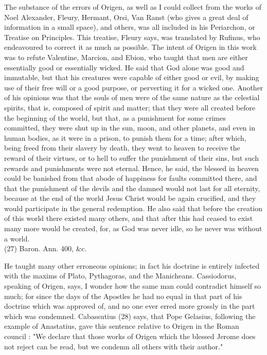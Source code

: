 \documentclass[12pt]{book}
\begin{document}
The substance of the errors of Origen, as well as I could collect from the works of Noel Alexander, Fleury,
Hermant, Orsi, Van Ranst (who gives a great deal of information in a small space), and others, was all
included in his Periarchon, or Treatise on Principles. This treatise, Fleury says, was translated by Rufinus,
who endeavoured to correct it as much as possible. The intent of Origen in this work was to refute
Valentine, Marcion, and Ebion, who taught that men are either essentially good or essentially wicked. He
said that God alone was good and immutable, but that his creatures were capable of either good or evil,
by making use of their free will or a good purpose, or perverting it for a wicked one. Another of his
opinions was that the souls of men were of the same nature as the celestial spirits, that is, composed of
spirit and matter; that they were all created before the beginning of the world, but that, as a punishment
for some crimes committed, they were shut up in the sun, moon, and other planets, and even in human
bodies, as it were in a prison, to punish them for a time; after which, being freed from their slavery by
death, they went to heaven to receive the reward of their virtues, or to hell to suffer the punishment of
their sins, but such rewards and punishments were not eternal. Hence, he said, the blessed in heaven
could be banished from that abode of happiness for faults committed there, and that the punishment of
the devils and the damned would not last for all eternity, because at the end of the world Jesus Christ
would be again crucified, and they would participate in the general redemption. He also said that before
the creation of this world there existed many others, and that after this had ceased to exist many more
would be created, for, as God was never idle, so he never was without a world.\\
(27) Baron. Ann. 400, \&c.

He taught many other erroneous opinions; in fact his doctrine is entirely infected with the maxims of
Plato, Pythagoras, and the Manicheans. Cassiodorus, speaking of Origen, says, I wonder how the same
man could contradict himself so much; for since the days of the Apostles he had no equal in that part of
his doctrine which was approved of, and no one ever erred more grossly in the part which was
condemned. Cabassutius (28) says, that Pope Gelasius, following the example of Anastatius, gave this
sentence relative to Origen in the Roman council : "We declare that those works of Origen which the
blessed Jerome does not reject can be read, but we condemn all others with their author."
\end{document}
